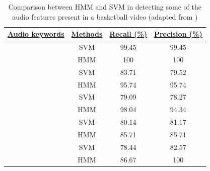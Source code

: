     \begin{table}[htbp]
        \centering
        \begin{tabular}{|c|c|c|c|}
        \hline
        \rowcolor[HTML]{C0C0C0} 
        {\ul \textbf{Audio keywords}}                                       & {\ul \textbf{Methods}} & {\ul \textbf{Recall (\%)}} & {\ul \textbf{Precision (\%)}} \\ \hline
        \cellcolor[HTML]{EFEFEF}                                            &\gls{SVM}                    & 99.45                      & 99.45                         \\ \cline{2-4} 
        \multirow{-2}{*}{\cellcolor[HTML]{EFEFEF}{\ul Whistling}}           &\gls{HMM}                   & 100                        & 100                           \\ \hline
        \cellcolor[HTML]{EFEFEF}                                            &\gls{SVM}                   & 83.71                      & 79.52                         \\ \cline{2-4} 
        \multirow{-2}{*}{\cellcolor[HTML]{EFEFEF}{\ul Audience}}            &\gls{HMM}                   & 95.74                      & 95.74                         \\ \hline
        \cellcolor[HTML]{EFEFEF}                                            &\gls{SVM}                    & 79.09                      & 78.27                         \\ \cline{2-4} 
        \multirow{-2}{*}{\cellcolor[HTML]{EFEFEF}{\ul Commentator}}         &\gls{HMM}                   & 98.04                      & 94.34                         \\ \hline
        \cellcolor[HTML]{EFEFEF}                                            &\gls{SVM}                   & 80.14                      & 81.17                         \\ \cline{2-4} 
        \multirow{-2}{*}{\cellcolor[HTML]{EFEFEF}{\ul Excited Audience}}    &\gls{HMM}                    & 85.71                      & 85.71                         \\ \hline
        \cellcolor[HTML]{EFEFEF}                                            &\gls{SVM}                   & 78.44                      & 82.57                         \\ \cline{2-4} 
        \multirow{-2}{*}{\cellcolor[HTML]{EFEFEF}{\ul Excited Commentator}} &\gls{HMM}                    & 86.67                      & 100                           \\ \hline
        \end{tabular}
        \caption{Comparison between \gls{HMM} and \gls{SVM} in detecting some of the audio features
present in a basketball video (adapted from \cite{AudioKeywordsSportsAnalysis})}
        \label{tab:ExperimentalResultsHMMbasedKeywords}
    \end{table}
    
